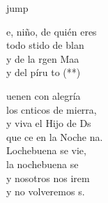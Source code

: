 \begin{cancion}jump\\
	\begin{chorus}%
		e, niño, de quién eres\\
		todo stido de blan\\
		y de la rgen Maa\\
		y del píru to (**)\jump\\
	\end{chorus}%
	uenen con alegría\\
	los cnticos de mierra,\\
	y viva el Hijo de Ds\\
	que ce en la Noche na.\\
	\jump
	Lochebuena se vie,\\
	la nochebuena se \\
	y nosotros nos irem\\
	y no volveremos s.\\
\end{cancion}%
